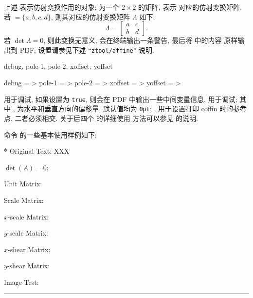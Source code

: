 \begin{function}[added=2025-05-12]{\ztoolboxaffine}
  \begin{syntax}
  \end{syntax}
  上述  表示仿射变换作用的对象;  为一个 $2\times 2$ 的矩阵, 表示
  对应的仿射变换矩阵. 若  $ = \{a, b, c, d\}$, 则其对应的仿射变换矩阵 $\Lambda$ 如下:
  \[
    \Lambda = \begin{bmatrix}
      a & c \\
      b & d
    \end{bmatrix}.
  \]
  若 $\det\Lambda = 0$, 则此变换无意义, \ztex{} 会在终端输出一条警告, 最后将  中的内容
  原样输出到 PDF;  设置请参见下述 ``\texttt{ztool/affine}'' 说明. 
\end{function}


\begin{keyval}[parent=ztool/affine]{debug, pole-1, pole-2, xoffset, yoffset}
  \begin{syntax}
    debug   = >
    pole-1  = >
    pole-2  = >
    xoffset = >\dval{0pt}
    yoffset = >\dval{0pt}
  \end{syntax}
   用于调试, 如果设置为 \texttt{true}, 则会在 PDF 中输出一些中间变量信息, 用于调试; 
  其中 ,  为水平和垂直方向的偏移量, 默认值均为 \texttt{0pt}; 
  ,  用于设置打印 coffin 时的参考点, 二者必须相交. 关于后四个  的详细使用
  方法可以参见  的说明.
\end{keyval}


命令  的一些基本使用样例如下:
\begin{DocExample}*
Original Text: XXX\par
$\det(A) = 0$: \par %
Unit Matrix: \par %
Scale Matrix: \par %
$x$-scale Matrix: \par %
$y$-scale Matrix: \par %
$x$-shear Matrix: \par %
$y$-shear Matrix: \par %
Image Test: \rule{2em}{2em}~
\end{DocExample}
